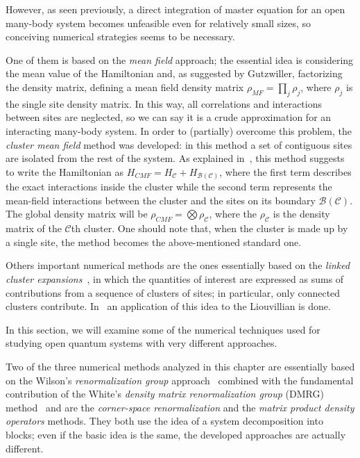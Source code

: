 However, as seen previously, a direct integration of master equation for an open many-body system becomes unfeasible even for relatively small sizes, so conceiving numerical strategies seems to be necessary.

One of them is based on the \emph{mean field} approach; the essential idea is considering the mean value of the Hamiltonian and, as suggested by Gutzwiller, factorizing the density matrix, defining a mean field density matrix $\rho_{MF} = \prod_j\rho_j$, where $\rho_j$ is the single site density matrix. In this way, all correlations and interactions between sites are neglected, so we can say it is a crude approximation for an interacting many-body system. In order to (partially) overcome this problem, the \emph{cluster mean field} method was developed: in this method a set of contiguous sites are isolated from the rest of the system. As explained in~\cite{PhysRevX.6.031011}, this method suggests to write the Hamiltonian as $H_{CMF} = H_\mathcal{C} + H_{\mathcal{B(C)}}$, where the first term describes the exact interactions inside the cluster while the second term represents the mean-field interactions between the cluster and the sites on its boundary $\mathcal{B(C)}$. The global density matrix will be $\rho_{CMF} = \bigotimes \rho_\mathcal{C}$, where the $\rho_\mathcal{C}$ is the density matrix of the $\mathcal{C}$th cluster. One should note that, when the cluster is made up by a single site, the method becomes the above-mentioned standard one. 

Others important numerical methods are the ones essentially based on the \emph{linked cluster expansions}~\cite{oitmaa}, in which the quantities of interest are expressed as sums of contributions from a sequence of clusters of sites; in particular, only connected clusters contribute. In~\cite{PhysRevX.6.021037} an application of this idea to the Liouvillian is done.

In this section, we will examine some of the numerical techniques used for studying open quantum systems with very different approaches.

Two of the three numerical methods analyzed in this chapter are essentially based on the Wilson's \emph{renormalization group} approach~\cite{RevModPhys.47.773} combined with the fundamental contribution of the White's \emph{density matrix renormalization group} (DMRG) method~\cite{s_white:dmrg} and are the \emph{corner-space renormalization} and the \emph{matrix product density operators} methods. They both use the idea of a system decomposition into blocks; even if the basic idea is the same, the developed approaches are actually different.

